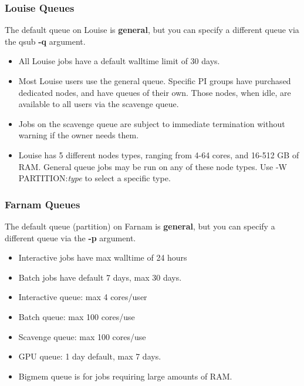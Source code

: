 \documentclass[10pt]{beamer}
\begin{document}
\begin{frame}
\frametitle{Louise Queues}
The default queue on Louise is \textbf{general}, but you can specify
a different queue via the qsub \textbf{-q} argument.

\begin{itemize}
\item All Louise jobs have a default walltime limit of 30 days.  
\item Most Louise users use the general queue.  Specific PI groups have purchased dedicated nodes, and have 
queues of their own.  Those nodes, when idle, are available to all users via the scavenge queue.  
\item Jobs on the scavenge queue are subject to immediate termination without warning if the owner needs them.
\item Louise has 5 different nodes types, ranging from 4-64 cores, and 16-512 GB of RAM.  General queue jobs may be run on any
of these node types.  Use -W PARTITION:\textit{type} to select a specific type. 
\end{itemize}

\end{frame}

\begin{frame}
\frametitle{Farnam Queues}
The default queue (partition) on Farnam is \textbf{general}, but you can specify
a different queue via the \textbf{-p} argument.

\begin{itemize}
\item Interactive jobs have max walltime of 24 hours
\item Batch jobs have default 7 days, max 30 days.
\item Interactive queue: max 4 cores/user
\item Batch queue: max 100 cores/use
\item Scavenge queue: max 100 cores/use
\item GPU queue: 1 day default, max 7 days.
\item Bigmem queue is for jobs requiring large amounts of RAM.
\end{itemize}

\end{frame}
\end{document}
